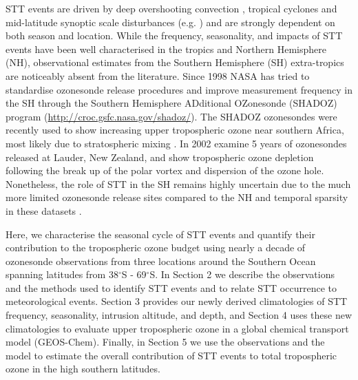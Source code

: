 STT events are driven by deep overshooting convection \citep{Frey2015}, tropical cyclones \citep{Das2016} and mid-latitude synoptic scale disturbances (e.g. \citet{Stohl2003, Mihalikova2012}) and are strongly dependent on both season and location. 
While the frequency, seasonality, and impacts of STT events have been well characterised in the tropics and Northern Hemisphere (NH), observational estimates from the Southern Hemisphere (SH) extra-tropics are noticeably absent from the literature. 
Since 1998 NASA has tried to standardise ozonesonde release procedures and improve measurement frequency in the SH through the Southern Hemisphere ADditional OZonesonde (SHADOZ) program (\url{http://croc.gsfc.nasa.gov/shadoz/}).
The SHADOZ ozonesondes were recently used to show increasing upper tropospheric ozone near southern Africa, most likely due to stratospheric mixing \citep{Liu2015, Thompson2014}.
In 2002 \citet{Brinksma2002} examine 5 years of ozonesondes released at Lauder, New Zealand, and show tropospheric ozone depletion following the break up of the polar vortex and dispersion of the ozone hole.
Nonetheless, the role of STT in the SH remains highly uncertain due to the much more limited ozonesonde release sites compared to the NH and temporal sparsity in these datasets  \citep{Liu2015, Thompson2014, Mze2010}. 



Here, we characterise the seasonal cycle of STT events and quantify their contribution to the tropospheric ozone budget using nearly a decade of ozonesonde observations from three locations around the Southern Ocean spanning latitudes from 38$^{\circ}$S - 69$^{\circ}$S. 
In Section 2 we describe the observations and the methods used to identify STT events and to relate STT occurrence to meteorological events.
Section 3 provides our newly derived climatologies of STT frequency, seasonality, intrusion altitude, and depth, and Section 4 uses these new climatologies to evaluate upper tropospheric ozone in a global chemical transport model (GEOS-Chem). 
Finally, in Section 5 we use the observations and the model to estimate the overall contribution of STT events to total tropospheric ozone in the high southern latitudes.
